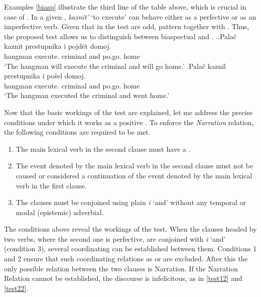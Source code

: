 Examples \ref{biasp} illustrate the third line of the table above, which is crucial in case of . In a given , \textit{kaznit'} `to execute' can behave either as a perfective or as an imperfective verb. Given that in the test   are odd,  pattern together with . Thus, the proposed test  allows us to distinguish between biaspectual and . 
\ex.\label{biasp}\ag.Pala\v{c} kaznit prestupnika i pojd\"et\textsuperscript{\PF} domoj.\\
hangman execute. criminal and po.go. home\\
`The hangman will execute the criminal and will go home.'
\bg.Pala\v{c} kaznil prestupnika i po\v{s}el\textsuperscript{\PF} domoj.\\
hangman execute. criminal and po.go. home\\
`The hangman executed the criminal and went home.'

Now that the basic workings of the test are explained, let me address the precise conditions under which it works as a positive . To enforce the \textit{Narration} relation, the following conditions are required to be met.
\begin{enumerate}
\item The main lexical verb in the second clause must have a .
\item The event denoted by the main lexical verb in the second clause must not be caused or considered a continuation of the event denoted by the main lexical verb in the first clause.
\item The clauses must be conjoined using plain  \textit{i} `and' without any temporal or modal (epistemic) adverbial.
\end{enumerate}
The conditions above reveal the workings of the test. When the clauses headed by two verbs, where the second one is perfective, are conjoined with \textit{i} `and' (condition 3), several coordinating  can be established between them. Conditions 1 and 2 ensure that such coordinating relations as  or  are excluded. After this the only possible relation between the two clauses is Narration. If the Narration Relation  cannot be established, the discourse is infelicitous, as in \ref{test12} and \ref{test22}.

